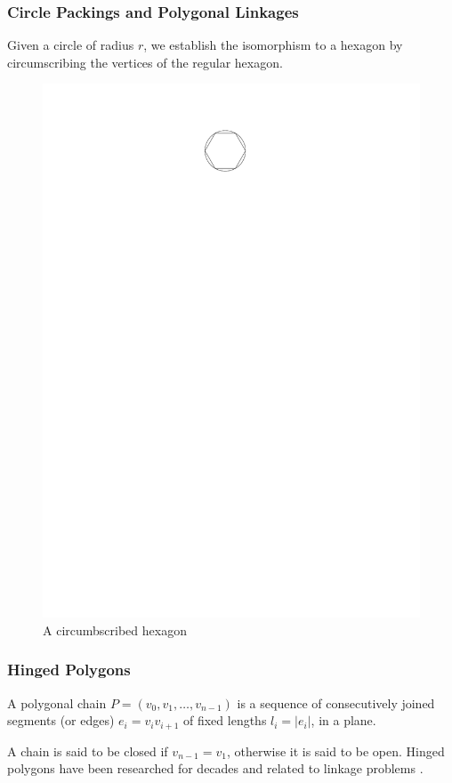 \subsubsection{Circle Packings and Polygonal Linkages}
Given a circle of radius $r$, we establish the isomorphism to a hexagon by
circumscribing the vertices of the regular hexagon.
\begin{figure}[h]
\begin{center}
\includegraphics{graphics/circumscribedHexagon.pdf}
\caption{A circumbscribed hexagon}
\end{center}
\end{figure}
\subsubsection{Hinged Polygons}
\begin{definition}\label{def}
A polygonal chain $P = \left( v_0, v_1, \dots, v_{n-1}\right) $ is a sequence of
consecutively joined segments (or edges) $e_i = v_i v_{i+1}$ of fixed lengths
$l_i = \left\vert e_i\right\vert $, in a plane. \cite{Biedl99lockedand}
\end{definition}
A chain is said to be closed if $v_{n-1} = v_1$, otherwise it is said to be
open. Hinged polygons have been researched for decades and related to linkage problems
\cite{Biedl99lockedand,canny1988complexity}.

